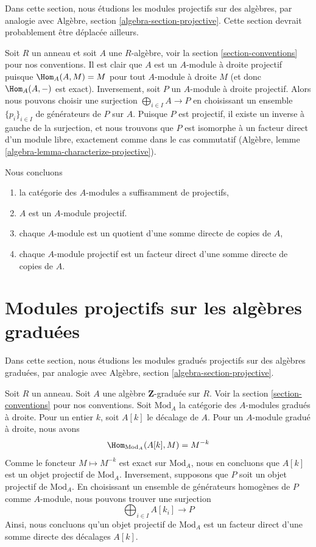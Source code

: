 \noindent
Dans cette section, nous étudions les modules projectifs sur des algèbres, par
analogie avec Algèbre, section
\ref{algebra-section-projective}. Cette section devrait probablement être déplacée ailleurs.

\medskip\noindent
Soit $R$ un anneau et soit $A$ une $R$-algèbre, voir la
section \ref{section-conventions} pour nos conventions. Il
est clair que $A$ est un $A$-module à droite projectif puisque
$\Hom_A(A, M) = M$ pour tout $A$-module à droite $M$ (et donc $\Hom_A(A, -)$ est
exact). Inversement, soit $P$ un $A$-module à droite projectif. Alors nous
pouvons choisir une surjection
$\bigoplus_{i \in I} A \to P$ en choisissant un ensemble $\{p_i\}_{i \in I}$
de générateurs de $P$ sur $A$. Puisque $P$ est projectif, il existe un
inverse à gauche de la surjection, et nous trouvons que $P$ est isomorphe à
un facteur direct d'un module libre, exactement comme dans le cas commutatif
(Algèbre, lemme \ref{algebra-lemma-characterize-projective}).

\medskip\noindent
Nous concluons
\begin{enumerate}
\item la catégorie des $A$-modules a suffisamment de projectifs,
\item $A$ est un $A$-module projectif.
\item chaque $A$-module est un quotient d'une somme directe de copies de $A$,
\item chaque $A$-module projectif est un facteur direct d'une somme
directe de copies de $A$.
\end{enumerate}



\section{Modules projectifs sur les algèbres graduées}
\label{section-projectives-over-graded-algebras}

\noindent
Dans cette section, nous étudions les modules gradués projectifs sur des algèbres
graduées, par analogie avec Algèbre, section \ref{algebra-section-projective}.

\medskip\noindent
Soit $R$ un anneau. Soit $A$ une algèbre $\mathbf{Z}$-graduée sur $R$.
Voir la section \ref{section-conventions} pour nos
conventions. Soit $\text{Mod}_A$ la catégorie des $A$-modules gradués à droite.
Pour un entier $k$, soit $A[k]$ le décalage de $A$. Pour un
$A$-module gradué à droite, nous avons
$$
\Hom_{\text{Mod}_A}(A[k], M) = M^{-k}
$$
Comme le foncteur $M \mapsto M^{-k}$ est exact sur $\text{Mod}_A$, nous
en concluons que $A[k]$ est un objet projectif de $\text{Mod}_A$.
Inversement, supposons que $P$ soit un objet projectif de $\text{Mod}_A$. En
choisissant un ensemble de générateurs homogènes de $P$ comme $A$-module, nous
pouvons trouver une surjection
$$
\bigoplus\nolimits_{i \in I} A[k_i] \longrightarrow P
$$
Ainsi, nous concluons qu'un objet projectif de $\text{Mod}_A$ est
un facteur direct d'une somme directe des décalages $A[k]$.


